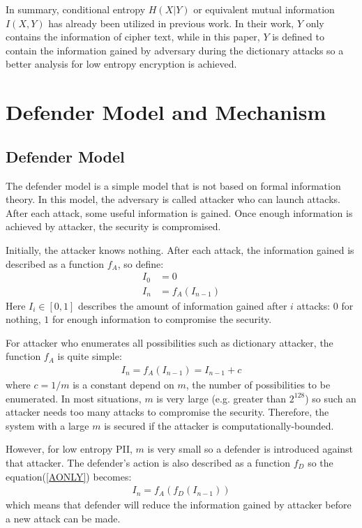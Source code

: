 \documentclass[10pt, conference, compsocconf]{IEEEtran}
\begin{document}
    In summary, conditional entropy $H(X|Y)$ or equivalent mutual information $I(X, Y)$
    has already been utilized in previous work. In their work, $Y$ only
    contains the information of cipher text, while in this paper, $Y$ is defined to contain the information
    gained by adversary during the dictionary attacks so a better analysis
    for low entropy encryption is achieved.

\section{Defender Model and Mechanism}\label{sec_def}
    \subsection{Defender Model}
        The defender model is a simple model that
        is not based on formal information theory.
        In this model, the adversary is called attacker
        who can launch attacks. After
        each attack, some useful information is gained.
        Once enough information is achieved by attacker,
        the security is compromised.

        Initially, the attacker knows nothing. After
        each attack, the information gained
        is described as a function $f_A$, so define:
        \begin{align}
            I_0 &= 0\\
            I_n &= f_A(I_{n-1})\label{AONLY}
        \end{align}
        Here $I_i \in [0, 1]$ describes the amount of information
        gained after $i$ attacks: $0$ for nothing, $1$ for enough
        information to compromise the security.

        For attacker who enumerates all possibilities such
        as dictionary attacker, the
        function $f_A$ is quite simple:
        \begin{align}
            I_n = f_A(I_{n-1}) = I_{n-1}+c\label{AONLYE}
        \end{align}
        where $c = 1/m$ is a constant depend on $m$,
        the number of possibilities to be enumerated.
        In most situations, $m$ is very large (e.g. greater than $2^{128}$)
         so such an attacker needs too many
        attacks to compromise the security. Therefore, the system with
        a large $m$ is secured if the attacker is computationally-bounded.

        However, for low entropy PII, $m$ is very small so
        a defender is introduced against that attacker.
        The defender's action is also described as a function $f_D$
        so the equation(\ref{AONLY}) becomes:
        \begin{align}
            I_n = f_A(f_D(I_{n-1}))
        \end{align}
        which means that defender will reduce the information
        gained by attacker before a new attack can be made.
\end{document}
